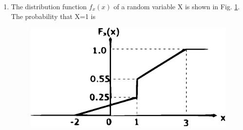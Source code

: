 \documentclass[journal,12pt,twocolumn]{IEEEtran}
\begin{document}
\begin{enumerate}
%
%
%
%


\item The distribution function $f_x(x)$ of a random variable X is shown in Fig. \ref{fig:12}. The probability that X=1 is
%
\begin{figure}[!h]
\includegraphics[width=\columnwidth]{./figs/figure12.eps}
\caption{}
\label{fig:12}
\end{figure}



\end{enumerate}
\end{document}
